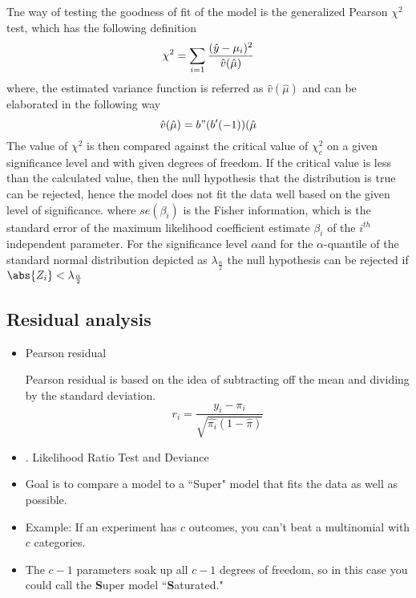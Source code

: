 Tne way of testing the goodness of fit of the model is the generalized Pearson $\chi^2$ test, which
has the following definition
\begin{equation}
	\centering
	\chi^2 = \sum_{i=1}\frac{(\hat{y}-\mu_i)^2}{\hat{v}(\hat{\mu})}	
\end{equation}
where, the estimated variance function is referred as $\hat{v}(\hat{\mu})$ and can be elaborated in the following
way 
\begin{equation}
	\centering
	\hat{v}(\hat{\mu})=b"(b'(-1))(\hat{\mu}	
\end{equation}
The value of $\chi^2$ is then compared against the critical value of $\chi^2_c $ on a given significance level and with given degrees of freedom. If the critical value is less than the calculated value, then the null hypothesis that the distribution is true can be rejected, hence the model does not fit the data well based on the given level of significance.
where ${se(\beta_i)}$ is the Fisher information, which is the standard error of the maximum likelihood coefficient estimate $\beta_i$ of the $i^{th}$ independent parameter.
For the significance level $\alpha $and for the $\alpha$-quantile of the standard normal distribution depicted as $\lambda_{\frac{\alpha}{2}}$
the null hypothesis can be rejected if $\abs{Z_i}<\lambda_{\frac{\alpha}{2}}$

\subsection{Residual analysis}
\begin{itemize}
	\item Pearson residual
	
	Pearson residual is based on the idea of subtracting off the mean and dividing by the standard deviation.
	\begin{equation}
		r_i = \frac{y_i - \pi_i}{\sqrt{\widehat{\pi_i}(1-\widehat{\pi})}}
	\end{equation}
	\item . {Likelihood Ratio Test and Deviance}
\end{itemize}
\begin{itemize}
	\item Goal is to compare a model to a ``Super" model that fits the data as well as possible.
	\item Example: If an experiment has $c$ outcomes, you can't beat a multinomial with $c$ categories. 
	\item The $c-1$ parameters soak up all $c-1$ degrees of freedom, so in this case you could call the \textbf{S}uper model ``\textbf{S}aturated."
\end{itemize}


